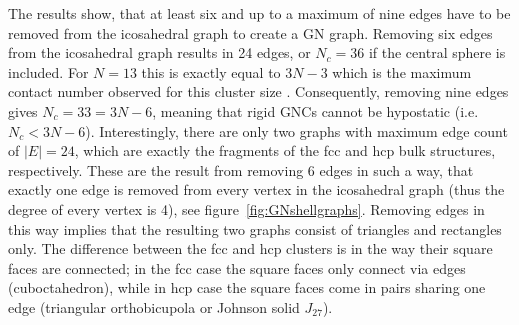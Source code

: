 The results show, that at least six and up to a maximum of nine edges have to be
removed from the icosahedral graph to create a GN graph. Removing six edges from
the icosahedral graph results in 24 edges, or $N_c=36$ if the central sphere is
included. For $N=13$ this is exactly equal to $3N-3$ which is the maximum
contact number observed for this cluster size
\autocite{Hoy_Structuredynamicsmodel_2015,Holmes-Cerfon_EnumeratingRigidSphere_2016}.
Consequently, removing nine edges gives $N_c=33=3N-6$, meaning that rigid GNCs
cannot be hypostatic (i.e. $N_c < 3N-6$). Interestingly, there are only two
graphs with maximum edge count of $|E|=24$, which are exactly the fragments of
the \acf{fcc} and \acf{hcp} bulk structures, respectively. These are the result
from removing 6 edges in such a way, that exactly one edge is removed from every
vertex in the icosahedral graph (thus the degree of every vertex is 4), see
figure~\ref{fig:GNshellgraphs}. Removing edges in this way implies that the
resulting two graphs consist of triangles and rectangles only. The difference
between the \ac{fcc} and \ac{hcp} clusters is in the way their square faces are
connected; in the \ac{fcc} case the square faces only connect via edges
(cuboctahedron), while in \ac{hcp} case the square faces come in pairs sharing
one edge (triangular orthobicupola or Johnson solid
$J_{27}$)\autocite{Kusner_ConfigurationSpacesEqual_2018}.

